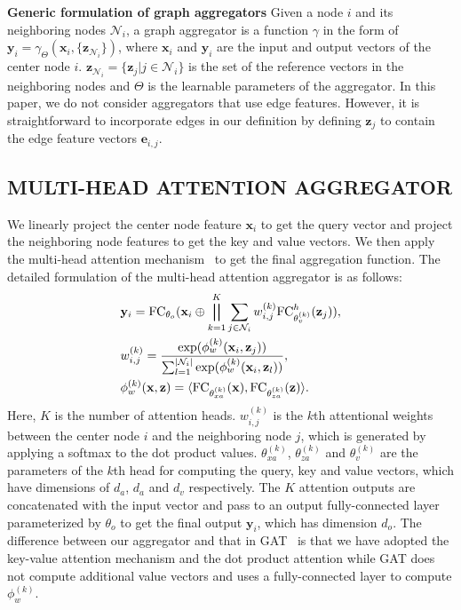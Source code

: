 \documentclass{article}
\begin{document}
	\textbf{Generic formulation of graph aggregators} \quad
	Given a node $i$ and its neighboring nodes $\mathcal{N}_i$, a graph aggregator is a function $\gamma$ in the form of $\mathbf{y}_i = \gamma_{\Theta}(\mathbf{x}_i, \{\mathbf{z}_{\mathcal{N}_i}\})$,
	where $\mathbf{x}_i$ and $\textbf{y}_i$ are the input and output vectors of the center node $i$. $\mathbf{z}_{\mathcal{N}_i} = \{\mathbf{z}_j | j \in \mathcal{N}_i\}$ is the set of the reference vectors in the neighboring nodes and $\Theta$ is the learnable parameters of the aggregator. In this paper, we do not consider aggregators that use edge features. However, it is straightforward to incorporate edges in our definition by defining $\mathbf{z}_j$ to contain the edge feature vectors $\mathbf{e}_{i, j}$.

	
\subsection{MULTI-HEAD ATTENTION AGGREGATOR}
	We linearly project the center node feature $\mathbf{x}_i$ to get the query vector and project the neighboring node features to get the key and value vectors. We then apply the multi-head attention mechanism~\citep{vaswani2017attention} to get the final aggregation function. The detailed formulation of the multi-head attention aggregator is as follows:
	\vskip -0.1in
	\begin{equation}
	\begin{aligned}
	& \mathbf{y}_i = \text{FC}_{\theta_o}(\mathbf{x}_i \oplus \bigparallel_{k=1}^K  \sum_{j\in \mathcal{N}_i}w^{(k)}_{i, j}\text{FC}^h_{\theta_{v}^{(k)}}(\mathbf{z}_j)),\\
	& w^{(k)}_{i, j} = \frac{\exp(\phi_w^{(k)}(\mathbf{x}_i,\mathbf{z}_j))}{\sum_{l=1}^{|\mathcal{N}_i|}\exp(\phi_w^{(k)}(\mathbf{x}_i,\mathbf{z}_l))}, \\  & \phi_w^{(k)}(\mathbf{x},\mathbf{z}) =  \langle\text{FC}_{\theta_{xa}^{(k)}}(\mathbf{x}), \text{FC}_{\theta_{za}^{(k)}}(\mathbf{z})\rangle.
	\end{aligned}
	\label{eq:attention-based}
	\end{equation}
	\vskip -0.1in
	Here, $K$ is the number of attention heads. $w^{(k)}_{i, j}$ is the $k$th attentional weights between the center node $i$ and the neighboring node $j$, which is generated by applying a softmax to the dot product values. $\theta_{xa}^{(k)}$, $\theta_{za}^{(k)}$ and $\theta_{v}^{(k)}$ are the parameters of the $k$th head for computing the query, key and value vectors, which have dimensions of $d_a$, $d_a$ and $d_v$ respectively. The $K$ attention outputs are concatenated with the input vector and pass to an output fully-connected layer parameterized by $\theta_o$ to get the final output $\mathbf{y}_i$, which has dimension $d_o$. 
	The difference between our aggregator and that in GAT~\citep{velivckovic2017graph} is that we have adopted the key-value attention mechanism and the dot product attention while GAT does not compute additional value vectors and uses a fully-connected layer to compute $\phi_w^{(k)}$.
	
\end{document}
